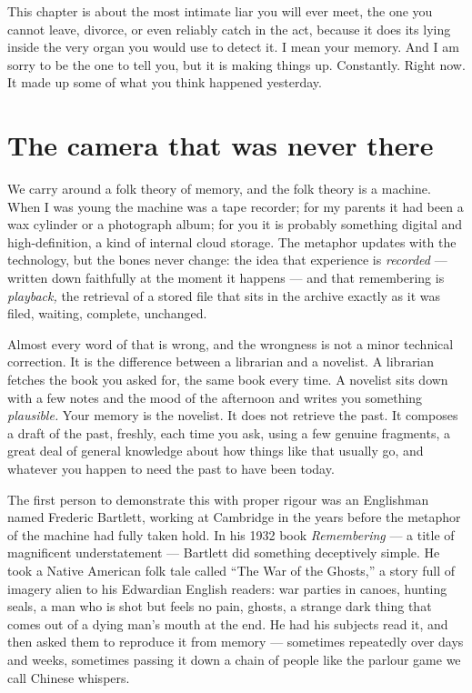 This chapter is about the most intimate liar you will ever meet, the one you cannot leave, divorce, or even reliably catch in the act, because it does its lying inside the very organ you would use to detect it. I mean your memory. And I am sorry to be the one to tell you, but it is making things up. Constantly. Right now. It made up some of what you think happened yesterday.

\section*{The camera that was never there}

We carry around a folk theory of memory, and the folk theory is a machine. When I was young the machine was a tape recorder; for my parents it had been a wax cylinder or a photograph album; for you it is probably something digital and high-definition, a kind of internal cloud storage. The metaphor updates with the technology, but the bones never change: the idea that experience is \emph{recorded} — written down faithfully at the moment it happens — and that remembering is \emph{playback,} the retrieval of a stored file that sits in the archive exactly as it was filed, waiting, complete, unchanged.

Almost every word of that is wrong, and the wrongness is not a minor technical correction. It is the difference between a librarian and a novelist. A librarian fetches the book you asked for, the same book every time. A novelist sits down with a few notes and the mood of the afternoon and writes you something \emph{plausible.} Your memory is the novelist. It does not retrieve the past. It composes a draft of the past, freshly, each time you ask, using a few genuine fragments, a great deal of general knowledge about how things like that usually go, and whatever you happen to need the past to have been today.

The first person to demonstrate this with proper rigour was an Englishman named Frederic Bartlett, working at Cambridge in the years before the metaphor of the machine had fully taken hold. In his 1932 book \emph{Remembering} — a title of magnificent understatement — Bartlett did something deceptively simple. He took a Native American folk tale called ``The War of the Ghosts,'' a story full of imagery alien to his Edwardian English readers: war parties in canoes, hunting seals, a man who is shot but feels no pain, ghosts, a strange dark thing that comes out of a dying man's mouth at the end. He had his subjects read it, and then asked them to reproduce it from memory — sometimes repeatedly over days and weeks, sometimes passing it down a chain of people like the parlour game we call Chinese whispers.

